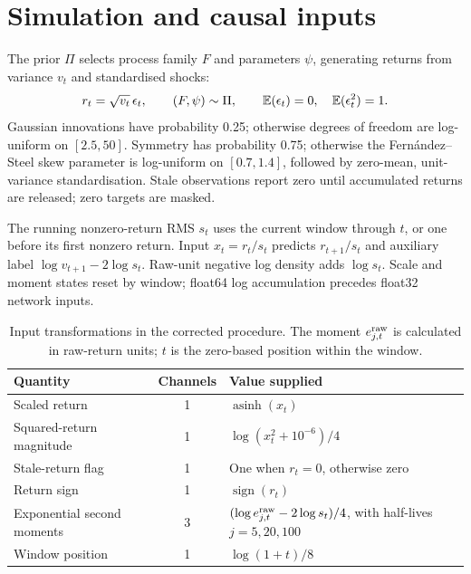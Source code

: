 \section{Simulation and causal inputs}

The prior $\Pi$ selects process family $F$ and parameters $\psi$, generating returns from variance $v_t$ and standardised shocks:
\begin{equation}
 r_t=\sqrt{v_t}\,\epsilon_t,\qquad
 (F,\psi)\sim\Pi,\qquad
 \mathbb{E}(\epsilon_t)=0,\quad \mathbb{E}(\epsilon_t^2)=1.
 \label{eq:volpfn-simulation}
\end{equation}
Gaussian innovations have probability 0.25; otherwise degrees of freedom are log-uniform on $[2.5,50]$. Symmetry has probability 0.75; otherwise the Fern\'andez--Steel skew parameter is log-uniform on $[0.7,1.4]$, followed by zero-mean, unit-variance standardisation. Stale observations report zero until accumulated returns are released; zero targets are masked.

The running nonzero-return RMS $s_t$ uses the current window through $t$, or one before its first nonzero return. Input $x_t=r_t/s_t$ predicts $r_{t+1}/s_t$ and auxiliary label $\log v_{t+1}-2\log s_t$. Raw-unit negative log density adds $\log s_t$. Scale and moment states reset by window; float64 log accumulation precedes float32 network inputs.

\begin{table}[htbp]
\centering\small
\caption[The eight causal input channels]{Input transformations in the corrected procedure. The moment $e^{\rm raw}_{j,t}$ is calculated in raw-return units; $t$ is the zero-based position within the window.}
\label{tab:appendix-input-channels}
\begin{tabular}{@{}p{3.2cm}cp{8.8cm}@{}}
\toprule Quantity & Channels & Value supplied \\
\midrule
Scaled return & 1 & $\operatorname{asinh}(x_t)$ \\
Squared-return magnitude & 1 & $\log(x_t^2+10^{-6})/4$ \\
Stale-return flag & 1 & One when $r_t=0$, otherwise zero \\
Return sign & 1 & $\operatorname{sign}(r_t)$ \\
Exponential second moments & 3 & $(\log e^{\rm raw}_{j,t}-2\log s_t)/4$, with half-lives $j=5,20,100$ \\
Window position & 1 & $\log(1+t)/8$ \\
\bottomrule
\end{tabular}
\end{table}


